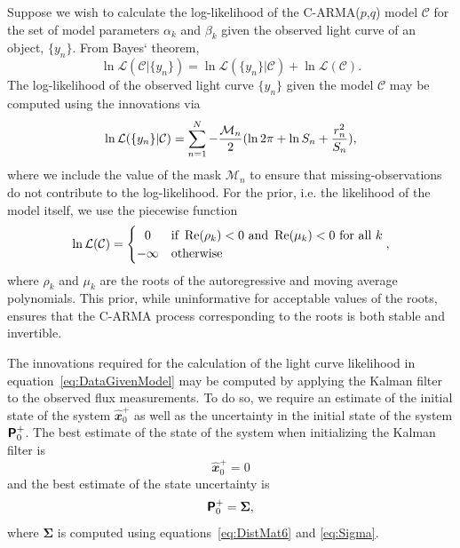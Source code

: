 \documentclass[a4paper,fleqn,usenatbib]{mnras}
\begin{document}
Suppose we wish to calculate the log-likelihood of the C-ARMA($p$,$q$) model $\mathcal{C}$ for the set of model parameters $\alpha_{k}$ and $\beta_{k}$ given the observed light curve of an object, $\{y_{n}\}$. From Bayes` theorem, 
\begin{equation}\label{eq:ModelGivenData}
\ln \mathcal{L}(\mathcal{C}|\{y_{n}\}) = \ln \mathcal{L}(\{y_{n}\}|\mathcal{C}) + \ln \mathcal{L}(\mathcal{C}).
\end{equation}
The log-likelihood of the observed light curve $\{y_{n}\}$ given the model $\mathcal{C}$ may be computed using the innovations via
\begin{equation}\label{eq:DataGivenModel}
\ln \mathcal{L}(\{y_{n}\}|\mathcal{C}) = \sum_{n = 1}^{N} -\frac{\mathcal{M}_{n}}{2}(\ln 2 \pi + \ln S_{n} + \frac{r_{n}^{2}}{S_{n}}),
\end{equation}
where we include the value of the mask $\mathcal{M}_{n}$ to ensure that missing-observations do not contribute to the log-likelihood. For the prior, i.e. the likelihood of the model itself, we use the piecewise function
\begin{equation}\label{eq:Prior}
\ln \mathcal{L}(\mathcal{C}) =
  \begin{cases} 
      \hfill 0    \hfill & \text{if~} \operatorname{Re}(\rho_{k}) < 0 \text{~and~} \operatorname{Re}(\mu_{k}) < 0 \text{~for all~} k  \\
      \hfill -\infty \hfill & \text{otherwise}
  \end{cases},
\end{equation}
where $\rho_{k}$ and $\mu_{k}$ are the roots of the autoregressive and moving average polynomials. This prior, while uninformative for acceptable values of the roots, ensures that the C-ARMA process corresponding to the roots is both stable and invertible.

The innovations required for the calculation of the light curve likelihood in equation~\eqref{eq:DataGivenModel} may be computed by applying the Kalman filter to the observed flux measurements. To do so, we require an estimate of the initial state of the system $\widehat{\mathbfit{x}}^{+}_{0}$ as well as the uncertainty in the initial state of the system $\textbf{\textsf{P}}^{+}_{0}$. The best estimate of the state of the system when initializing the Kalman filter is
\begin{equation}\label{eq:x0}
\widehat{\mathbfit{x}}^{+}_{0} = \mathbfit{0}
\end{equation}
and the best estimate of the state uncertainty is
\begin{equation}\label{eq:P0}
\textbf{\textsf{P}}^{+}_{0} = \boldsymbol{\Sigma},
\end{equation}
where $\boldsymbol{\Sigma}$ is computed using equations~\eqref{eq:DistMat6} and \eqref{eq:Sigma}.
\end{document}

